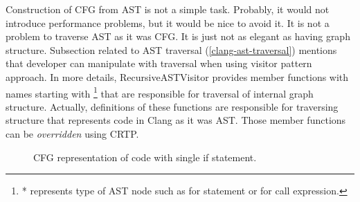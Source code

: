 Construction of CFG from AST is not a simple task. Probably, it would not introduce performance problems, but it would be nice to avoid it. It is not a problem to traverse AST as it was CFG. It is just not as elegant as having graph structure. Subsection related to AST traversal (\ref{clang-ast-traversal}) mentions that developer can manipulate with traversal when using visitor pattern approach. In more details, RecursiveASTVisitor provides member functions with names starting with \footnote{* represents type of AST node such as  for statement or  for call expression.} that are responsible for traversal of internal graph structure. Actually, definitions of these functions are responsible for traversing structure that represents code in Clang as it was AST. Those member functions can be \textit{overridden} using CRTP.

\begin{figure}[h!]
\caption{CFG representation of code with single if statement.}
\label{example-cfg}
\vspace{.5cm}
\centering
{}
\end{figure}

